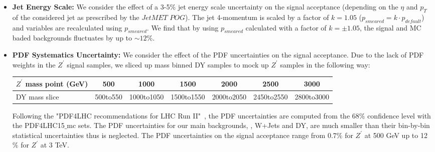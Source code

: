 \begin{itemize}
  \item \textbf{Jet Energy Scale:} We consider the effect of a 3-5\% jet energy scale uncertainty on the signal 
acceptance (depending on the $\eta$ and $p_{T}$ of the considered jet as prescribed by the $JetMET$ $POG$). The jet 
4-momentum is scaled by a factor of $k=1.05$ ($p_{smeared} = k \cdot p_{default}$) and variables are recalculated 
using $p_{smeared}$. We find that by using $p_{smeared}$ calculated with
a factor of $k=\pm 1.05$, the signal and MC baded backgrounds fluctuates by up to $\sim 12$\%. 
%

  \item \textbf{PDF Systematics Uncertainty:} We consider the effect of the PDF uncertainties on the signal acceptance. 
Due to the lack of PDF weights in the $Z^\prime$ signal samples, we sliced up mass binned DY samples to mock up $Z^\prime$ samples in 
the following way:
\begin{table}[ht]	
  \begin{tabular}{| l | c | c | c | c | c | c |} 
  \hline\hline 
  $Z^\prime$ mass point (GeV) & 500 & 1000 & 1500 & 2000 & 2500 & 3000\\
  \hline
  DY mass slice & 500to550 & 1000to1050 & 1500to1550 & 2000to2050 & 2450to2550 & 2800to3000\\
  \hline \hline
  \end{tabular}
\end{table}

Following the "PDF4LHC recommendations for LHC Run
II"~\cite{PDF4LHC15}, the PDF uncertainties are computed from the
68$\%$ confidence level with the PDF4LHC15$\_$mc sets. The PDF
uncertainties for our main backgrounds, \ttbar, W+Jets and DY, are
much smaller than their bin-by-bin statistical uncertainties thus is
neglected. The PDF uncertainties on the signal acceptance range from
0.7$\%$ for $Z^\prime$ at 500 GeV up to 12$\%$ for $Z^\prime$ at 3 TeV.



\end{itemize}
